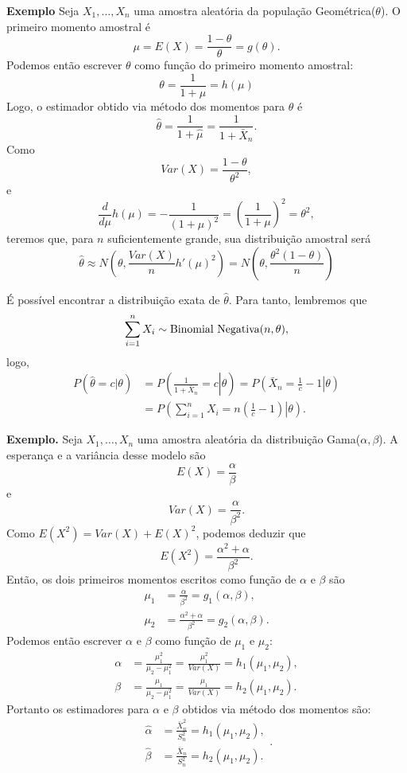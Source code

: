 \documentclass[
  letterpaper,
  DIV=11,
  numbers=noendperiod]{scrartcl}
\begin{document}
\textbf{Exemplo} Seja \(X_1,\ldots,X_n\) uma amostra aleatória da
população Geométrica(\(\theta\)). O primeiro momento amostral é
\[\mu=E(X)=\frac{1-\theta}{\theta}=g(\theta).\] Podemos então escrever
\(\theta\) como função do primeiro momento amostral:
\[\theta=\frac{1}{1+\mu}=h(\mu)\] Logo, o estimador obtido via método
dos momentos para \(\theta\) é
\[\hat{\theta}=\frac{1}{1+\hat{\mu}}=\frac{1}{1+\bar{X}_n}.\] Como
\[Var(X)=\frac{1-\theta}{\theta^2},\] e
\[\frac{d}{d\mu}h(\mu)=-\frac{1}{(1+\mu)^2}=\left(\frac{1}{1+\mu}\right)^2=\theta^2,\]
teremos que, para \(n\) suficientemente grande, sua distribuição
amostral será
\[\hat{\theta}\approx N\left(\theta,\frac{Var(X)}{n}h'(\mu)^2\right)=N\left(\theta,\frac{\theta^2(1-\theta)}{n}\right)\]

É possível encontrar a distribuição exata de \(\hat{\theta}\). Para
tanto, lembremos que
\[\sum_{i=1}^n X_i\sim \hbox{Binomial Negativa}(n,\theta),\] logo,
\[\begin{align}P\left(\hat{\theta}=c|\theta\right)&=P\left(\left.\frac{1}{1+\bar{X}_n}=c\right|\theta\right)=P\left(\left.\bar{X}_n=\frac{1}{c}-1\right|\theta\right)\\&=
P\left(\left.\sum_{i=1}^n X_i=n\left(\frac{1}{c}-1\right)\right|\theta\right).
\end{align}\]

\textbf{Exemplo.} Seja \(X_1,\ldots,X_n\) uma amostra aleatória da
distribuição Gama(\(\alpha,\beta\)). A esperança e a variância desse
modelo são \[E(X)=\frac{\alpha}{\beta}\] e
\[Var(X)=\frac{\alpha}{\beta^2}.\] Como \(E(X^2)=Var(X)+E(X)^2\),
podemos deduzir que \[E(X^2)=\frac{\alpha^2+\alpha}{\beta^2}.\] Então,
os dois primeiros momentos escritos como função de \(\alpha\) e
\(\beta\) são
\[\begin{align}\mu_1&=\frac{\alpha}{\beta^2}=g_1(\alpha,\beta),\\
\mu_2&=\frac{\alpha^2+\alpha}{\beta^2}=g_2(\alpha,\beta).\end{align}\]
Podemos então escrever \(\alpha\) e \(\beta\) como função de \(\mu_1\) e
\(\mu_2\):
\[\begin{align}\alpha&=\frac{\mu_1^2}{\mu_2-\mu_1^2}=\frac{\mu_1^2}{Var(X)}=h_1(\mu_1,\mu_2),\\
\beta&=\frac{\mu_1}{\mu_2-\mu_1^2}=\frac{\mu_1}{Var(X)}=h_2(\mu_1,\mu_2).\end{align}\]
Portanto os estimadores para \(\alpha\) e \(\beta\) obtidos via método
dos momentos são:
\[\begin{align}\hat{\alpha}&=\frac{\bar{X}_n^2}{S^2_n}=h_1(\mu_1,\mu_2),\\
\hat{\beta}&=\frac{\bar{X}_n}{S^2_n}=h_2(\mu_1,\mu_2).\end{align}.\]
\end{document}

